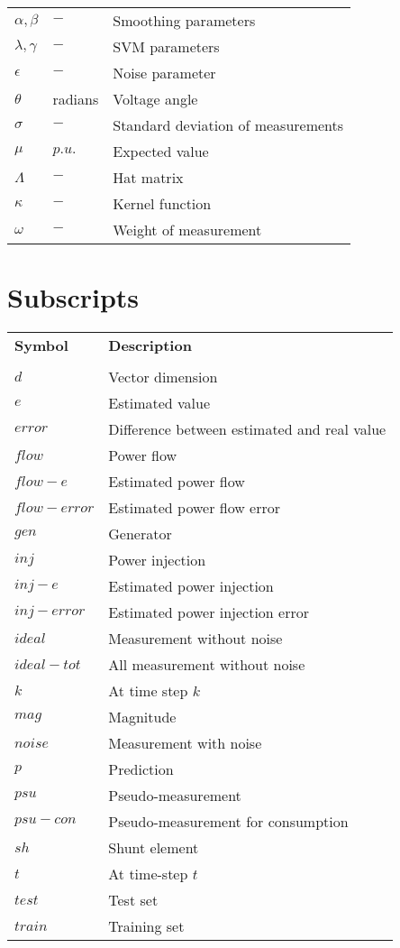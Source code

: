 \begin{longtable}[l]{p{\ThreeFirstCol} p{\ThreeSecondCol} p{\ThreeThirdCol}}
  $\alpha,\beta$   & $-$	& Smoothing parameters\\
  $\lambda,\gamma$   & $-$	& SVM parameters\\
  $\epsilon$   & $-$	& Noise parameter\\
  $\theta$   & radians	& Voltage angle\\
  $\sigma$   & $-$	& Standard deviation of measurements\\
  $\mu$   & $p.u.$	& Expected value\\
  $\Lambda$ & $-$ & Hat matrix\\
  $\kappa$ & $-$ & Kernel function\\
  $\omega$ & $-$ & Weight of measurement\\

  


\end{longtable} 
 
\section*{Subscripts}
\begin{longtable}[l]{p{\TwoFirstCol} p{\TwoSecondCol}}
\textbf{Symbol}	&  \textbf{Description} \\ 
\smallskip \\
$d$ & Vector dimension\\
$e$ & Estimated value\\
$error$ & Difference between estimated and real value\\
$flow$ 	& Power flow\\
$flow-e$ 	& Estimated power flow\\
$flow-error$ 	& Estimated power flow error\\
$gen$ 	& Generator\\
$inj$ 	& Power injection\\
$inj-e$ 	& Estimated power injection\\
$inj-error$ 	& Estimated power injection error\\
$ideal$ 	& Measurement without noise\\
$ideal-tot$ 	& All measurement without noise\\
$k$			& At time step $k$\\
$mag$ 	& Magnitude\\
$noise$ 	& Measurement with noise\\
$p$     & Prediction\\
$psu$     & Pseudo-measurement\\
$psu-con$     & Pseudo-measurement for consumption\\
$sh$ 	& Shunt element\\
$t$ 	& At time-step $t$\\
$test$ 	& Test set\\
$train$     & Training set\\

\end{longtable} 
\newpage

